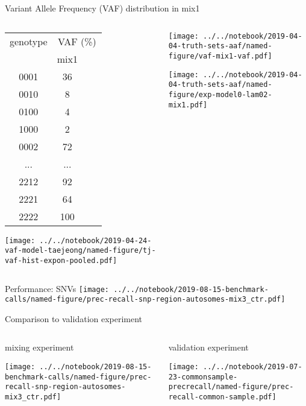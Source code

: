 \documentclass{beamer}
\begin{document}
\begin{frame}{Variant Allele Frequency (VAF) distribution in mix1}
\begin{columns}[t]
\begin{column}{0.5\textwidth}

{\tiny
\begin{tabular}{c|ccc}
genotype & \multicolumn{3}{c}{VAF (\%)} \\
& mix1 \\
\hline
0001 & 36 \\
0010 & 8 \\
0100 & 4 \\
1000 & 2 \\
0002 & 72 \\
... & ... \\
2212 & 92 \\
2221 & 64 \\
2222 & 100 \\
\end{tabular}
}

\texttt{[image: ../../notebook/2019-04-24-vaf-model-taejeong/named-figure/tj-vaf-hist-expon-pooled.pdf]}

\end{column}

\begin{column}{0.5\textwidth}

\texttt{[image: ../../notebook/2019-04-04-truth-sets-aaf/named-figure/vaf-mix1-vaf.pdf]}

\texttt{[image: ../../notebook/2019-04-04-truth-sets-aaf/named-figure/exp-model0-lam02-mix1.pdf]}
\end{column}
\end{columns}
\end{frame}

\begin{frame}{Performance: SNVs}
\texttt{[image: ../../notebook/2019-08-15-benchmark-calls/named-figure/prec-recall-snp-region-autosomes-mix3\_ctr.pdf]}
\end{frame}

\begin{frame}{Comparison to validation experiment}
\begin{columns}[t]
\begin{column}{0.4\textwidth}

mixing experiment

\texttt{[image: ../../notebook/2019-08-15-benchmark-calls/named-figure/prec-recall-snp-region-autosomes-mix3\_ctr.pdf]}
\end{column}
\begin{column}{0.7\textwidth}

validation experiment

\texttt{[image: ../../notebook/2019-07-23-commonsample-precrecall/named-figure/prec-recall-common-sample.pdf]}
\end{column}
\end{columns}
\end{frame}
\end{document}
